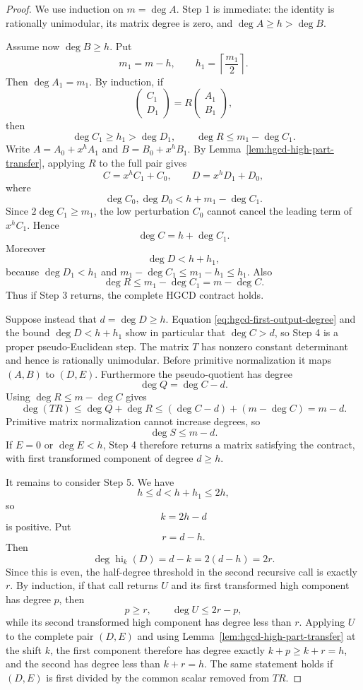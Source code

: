 \documentclass[11pt]{book}
\theoremstyle{definition}
\begin{document}
\begin{proof}
We use induction on $m=\deg A$.  Step 1 is immediate: the identity is
rationally unimodular, its matrix degree is zero, and
$\deg A\ge h>\deg B$.

Assume now $\deg B\ge h$.  Put
\[
 m_1=m-h,
 \qquad
 h_1=\left\lceil\frac{m_1}{2}\right\rceil.
\]
Then $\deg A_1=m_1$.  By induction, if
\[
 \begin{pmatrix}C_1\\D_1\end{pmatrix}
 =R\begin{pmatrix}A_1\\B_1\end{pmatrix},
\]
then
\[
 \deg C_1\ge h_1>\deg D_1,
 \qquad
 \deg R\le m_1-\deg C_1.
\]
Write $A=A_0+x^hA_1$ and $B=B_0+x^hB_1$.  By
Lemma~\ref{lem:hgcd-high-part-transfer}, applying $R$ to the full pair gives
\[
 C=x^hC_1+C_0,
 \qquad
 D=x^hD_1+D_0,
\]
where
\[
 \deg C_0,\deg D_0
 <h+m_1-\deg C_1.
\]
Since $2\deg C_1\ge m_1$, the low perturbation $C_0$ cannot cancel the
leading term of $x^hC_1$.  Hence
\begin{equation}\label{eq:hgcd-first-output-degree}
 \deg C=h+\deg C_1.
\end{equation}
Moreover
\[
 \deg D<h+h_1,
\]
because $\deg D_1<h_1$ and
$m_1-\deg C_1\le m_1-h_1\le h_1$.  Also
\[
 \deg R\le m_1-\deg C_1=m-\deg C.
\]
Thus if Step 3 returns, the complete HGCD contract holds.

Suppose instead that $d=\deg D\ge h$.  Equation
\eqref{eq:hgcd-first-output-degree} and the bound $\deg D<h+h_1$ show in
particular that $\deg C>d$, so Step 4 is a proper pseudo-Euclidean step.  The
matrix $T$ has nonzero constant determinant and hence is rationally
unimodular.  Before primitive normalization it maps $(A,B)$ to $(D,E)$.
Furthermore the pseudo-quotient has degree
\[
 \deg Q=\deg C-d.
\]
Using $\deg R\le m-\deg C$ gives
\[
 \deg(TR)
 \le \deg Q+\deg R
 \le (\deg C-d)+(m-\deg C)
 =m-d.
\]
Primitive matrix normalization cannot increase degrees, so
\begin{equation}\label{eq:hgcd-crossing-matrix-bound}
 \deg S\le m-d.
\end{equation}
If $E=0$ or $\deg E<h$, Step 4 therefore returns a matrix satisfying the
contract, with first transformed component of degree $d\ge h$.

It remains to consider Step 5.  We have
\[
 h\le d<h+h_1\le2h,
\]
so
\[
 k=2h-d
\]
is positive.  Put
\[
 r=d-h.
\]
Then
\begin{equation}\label{eq:hgcd-second-high-degree}
 \deg\operatorname{hi}_k(D)
 =d-k=2(d-h)=2r.
\end{equation}
Since this is even, the half-degree threshold in the second recursive call is
exactly $r$.  By induction, if that call returns $U$ and its first transformed
high component has degree $p$, then
\[
 p\ge r,
 \qquad
 \deg U\le2r-p,
\]
while its second transformed high component has degree less than $r$.
Applying $U$ to the complete pair $(D,E)$ and using
Lemma~\ref{lem:hgcd-high-part-transfer} at the shift $k$, the first component
therefore has degree exactly $k+p\ge k+r=h$, and the second has degree less
than $k+r=h$.  The same statement holds if $(D,E)$ is first divided by the
common scalar removed from $TR$.


\end{proof}
\end{document}
